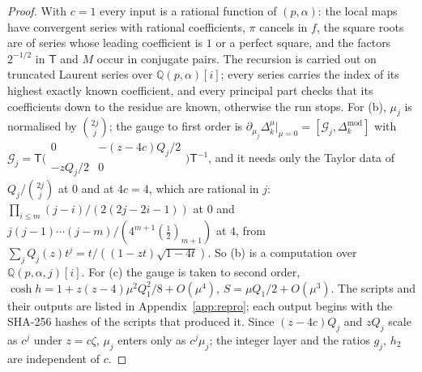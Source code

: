 \begin{proof}
With $c=1$ every input is a rational function of $(p,\alpha)$: the local maps have convergent series with rational
coefficients, $\pi$ cancels in $f$, the square roots are of series whose leading coefficient is $1$ or a perfect square,
and the factors $2^{-1/2}$ in $\mathsf T$ and $M$ occur in conjugate pairs. The recursion is carried out on truncated
Laurent series over $\mathbb Q(p,\alpha)[i]$; every series carries the index of its highest exactly known coefficient, and
every principal part checks that its coefficients down to the residue are known, otherwise the run stops. For (b),
$\mu_j$ is normalised by $\binom{2j}j$; the gauge to first order is $\partial_{\mu_j}\Delta_k^\mu|_{\mu=0}=[\mathcal G_j,\Delta_k^{\mathrm{mod}}]$
with $\mathcal G_j=\mathsf T\bigl(\begin{smallmatrix}0&-(z-4c)Q_j/2\\-zQ_j/2&0\end{smallmatrix}\bigr)\mathsf T^{-1}$, and it needs only the
Taylor data of $Q_j/\binom{2j}j$ at $0$ and at $4c=4$, which are rational in $j$: $\prod_{i\le m}(j-i)/(2(2j-2i-1))$ at $0$
and $j(j-1)\cdots(j-m)/(4^{m+1}(\frac12)_{m+1})$ at $4$, from $\sum_jQ_j(z)t^j=t/((1-zt)\sqrt{1-4t})$. So (b) is a
computation over $\mathbb Q(p,\alpha,j)[i]$. For (c) the gauge is taken to second order,
$\cosh h=1+z(z-4)\mu^2Q_1^2/8+O(\mu^4)$, $S=\mu Q_1/2+O(\mu^3)$. The scripts and their outputs are listed in
Appendix~\ref{app:repro}; each output begins with the SHA-256 hashes of the scripts that produced it. Since $(z-4c)Q_j$ and
$zQ_j$ scale as $c^j$ under $z=c\zeta$, $\mu_j$ enters only as $c^j\mu_j$; the integer layer and the ratios $g_j$, $h_2$
are independent of $c$.
\end{proof}


